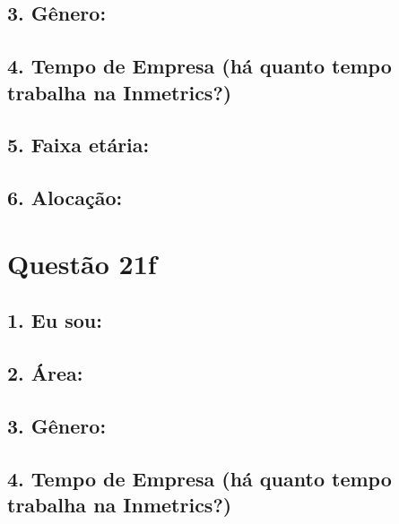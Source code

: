 \documentclass[]{book}
\begin{document}
\hypertarget{genero-65}{%
\subsection{3. Gênero:}\label{genero-65}}

\hypertarget{tempo-de-empresa-ha-quanto-tempo-trabalha-na-inmetrics-65}{%
\subsection{4. Tempo de Empresa (há quanto tempo trabalha na Inmetrics?)}\label{tempo-de-empresa-ha-quanto-tempo-trabalha-na-inmetrics-65}}

\hypertarget{faixa-etaria-65}{%
\subsection{5. Faixa etária:}\label{faixa-etaria-65}}

\hypertarget{alocacao-65}{%
\subsection{6. Alocação:}\label{alocacao-65}}

\hypertarget{questao-21f}{%
\section{Questão 21f}\label{questao-21f}}

\hypertarget{eu-sou-66}{%
\subsection{1. Eu sou:}\label{eu-sou-66}}

\hypertarget{area-66}{%
\subsection{2. Área:}\label{area-66}}

\hypertarget{genero-66}{%
\subsection{3. Gênero:}\label{genero-66}}

\hypertarget{tempo-de-empresa-ha-quanto-tempo-trabalha-na-inmetrics-66}{%
\subsection{4. Tempo de Empresa (há quanto tempo trabalha na Inmetrics?)}\label{tempo-de-empresa-ha-quanto-tempo-trabalha-na-inmetrics-66}}
\end{document}
